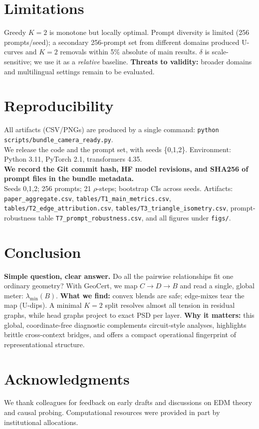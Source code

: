\documentclass[11pt]{article}
\newcommand{\1}{\mathbf{1}}
\begin{document}
\section{Limitations}
Greedy $K{=}2$ is monotone but locally optimal. Prompt diversity is limited (256 prompts/seed); a secondary 256-prompt set from different domains produced U-curves and $K{=}2$ removals within 5\% absolute of main results. $\delta$ is scale-sensitive; we use it as a \emph{relative} baseline. \textbf{Threats to validity:} broader domains and multilingual settings remain to be evaluated.

\section{Reproducibility}
All artifacts (CSV/PNGs) are produced by a single command:
\texttt{python scripts/bundle\_camera\_ready.py}.\\
We release the code and the prompt set, with seeds \{0,1,2\}. Environment: Python 3.11, PyTorch 2.1, transformers 4.35.\\
\textbf{We record the Git commit hash, HF model revisions, and SHA256 of prompt files in the bundle metadata.}\\
Seeds 0,1,2; 256 prompts; 21 $\rho$-steps; bootstrap CIs across seeds. Artifacts: \texttt{paper\_aggregate.csv}, \texttt{tables/T1\_main\_metrics.csv}, \texttt{tables/T2\_edge\_attribution.csv}, \texttt{tables/T3\_triangle\_isometry.csv}, prompt-robustness table \texttt{T7\_prompt\_robustness.csv}, and all figures under \texttt{figs/}.

\section{Conclusion}
\textbf{Simple question, clear answer.} Do all the pairwise relationships fit one ordinary geometry? With GeoCert, we map $C\!\to\!D\!\to\!B$ and read a single, global meter: $\lambda_{\min}(B)$. \textbf{What we find:} convex blends are safe; edge-mixes tear the map (U-dips). A minimal $K{=}2$ split resolves almost all tension in residual graphs, while head graphs project to exact PSD per layer. \textbf{Why it matters:} this global, coordinate-free diagnostic complements circuit-style analyses, highlights brittle cross-context bridges, and offers a compact operational fingerprint of representational structure.

\section*{Acknowledgments}
We thank colleagues for feedback on early drafts and discussions on EDM theory and causal probing. Computational resources were provided in part by institutional allocations.
\end{document}
